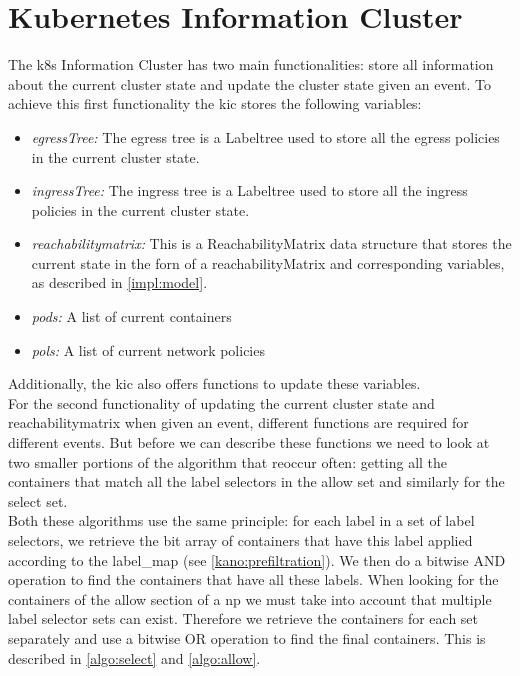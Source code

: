 \section{Kubernetes Information Cluster} \label{impl:Kic}
The \acrshort{k8s} Information Cluster has two main functionalities: store all information about the current cluster state and update the cluster state given an event. To achieve this first functionality the \acrshort{kic} stores the following variables:
\begin{itemize}
    \renewcommand{\labelitemi}{\scriptsize$\blacksquare$}
    \item \textit{egressTree:} The egress tree is a Labeltree used to store all the egress policies in the current cluster state.
    \item \textit{ingressTree:} The ingress tree is a Labeltree used to store all the ingress policies in the current cluster state.
    \item \textit{reachabilitymatrix:} This is a ReachabilityMatrix data structure that stores the current state in the forn of a reachabilityMatrix and corresponding variables, as described in \autoref{impl:model}.
    \item \textit{pods:} A list of current containers
    \item \textit{pols:} A list of current network policies
\end{itemize}
Additionally, the \acrshort{kic} also offers functions to update these variables. 
\\[10pt]
For the second functionality of updating the current cluster state and reachabilitymatrix when given an event, different functions are required for different events. But before we can describe these functions we need to look at two smaller portions of the algorithm that reoccur often: getting all the containers that match all the label selectors in the allow set and similarly for the select set.
\\[10pt]

Both these algorithms use the same principle: for each label in a set of label selectors, we retrieve the bit array of containers that have this label applied according to the label\_map (see \autoref{kano:prefiltration}). We then do a bitwise AND operation to find the containers that have all these labels. When looking for the containers of the allow section of a \acrshort{np} we must take into account that multiple label selector sets can exist. Therefore we retrieve the containers for each set separately and use a bitwise OR operation to find the final containers. This is described in \autoref{algo:select} and \autoref{algo:allow}. 
\\[10pt]



